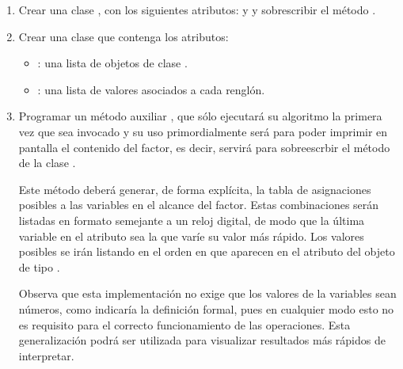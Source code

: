 \begin{enumerate}
  \item Crear una clase , con los siguientes atributos:  y  y sobrescribir el método .
  \item Crear una clase  que contenga los atributos: 
    \begin{itemize}
      \item {}: una lista de objetos de clase .
      \item {}: una lista de valores asociados a cada renglón.
    \end{itemize}
    
  \item Programar un método auxiliar , que sólo ejecutará su algoritmo la primera vez que sea invocado y su uso primordialmente será para poder imprimir en pantalla el contenido del factor, es decir, servirá para sobreescrbir el método  de la clase .
  
  Este método deberá generar, de forma explícita, la tabla de asignaciones posibles a las variables en el alcance del factor.  Estas combinaciones serán listadas en formato semejante a un reloj digital, de modo que la última variable en el atributo  sea la que varíe su valor más rápido.  Los valores posibles se irán listando en el orden en que aparecen en el atributo  del objeto de tipo .
  
  Observa que esta implementación no exige que los valores de la variables sean números, como indicaría la definición formal, pues en cualquier modo esto no es requisito para el correcto funcionamiento de las operaciones.  Esta generalización podrá ser utilizada para visualizar resultados más rápidos de interpretar.
  

\end{enumerate}
